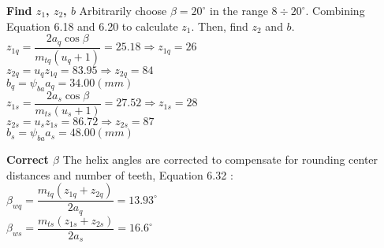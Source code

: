 \textbf{Find $ z_1 $, $ z_2 $, $ b $} Arbitrarily choose $ \beta = 20^\circ $ in the range $ 8 \div 20^\circ $. Combining Equation 6.18 and 6.20 \cite{tk1} to calculate $ z_1 $. Then, find $ z_2 $ and $ b $.\\
$ z_{1q} = \dfrac{2a_{q}\cos\beta}{m_{tq}(u_q+1)} = 25.18 \Rightarrow z_{1q} = 26$\\
$ z_{2q} = u_{q}z_{1q} = 83.95 \Rightarrow z_{2q} = 84 $\\
$ b_q = \psi_{ba}a_{q} = 34.00\unit{(mm)}$\\
$ z_{1s} = \dfrac{2a_{s}\cos\beta}{m_{ts}(u_s+1)} = 27.52 \Rightarrow z_{1s} = 28$\\
$ z_{2s} = u_{s}z_{1s} = 86.72 \Rightarrow z_{2s} = 87 $\\
$ b_s = \psi_{ba}a_{s} = 48.00\unit{(mm)}$

\textbf{Correct $ \beta $} The helix angles are corrected to compensate for rounding center distances and number of teeth, Equation 6.32 \cite{tk1}:\\
$ \beta_{wq} = \dfrac{m_{tq}(z_{1q}+z_{2q})}{2a_q} = 13.93 ^\circ$\\
$ \beta_{ws} = \dfrac{m_{ts}(z_{1s}+z_{2s})}{2a_s} = 16.6 ^\circ$

%

